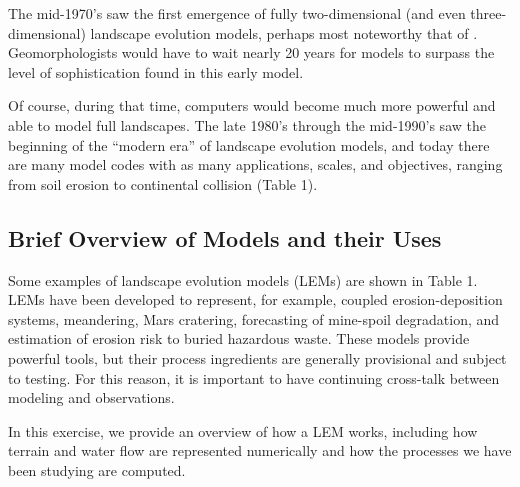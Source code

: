 \documentclass[12pt,reqno]{amsart}
\begin{document}
The mid-1970's saw the first emergence of fully two-dimensional (and
even three-dimensional) landscape evolution models, perhaps most
noteworthy that of \citet{ahnert1976}. Geomorphologists
would have to wait nearly 20 years for models to surpass the level of
sophistication found in
this early model. 

Of course, during that time, computers would become much more powerful
and able to model full landscapes. The late 1980's through the
mid-1990's saw the beginning of the ``modern era'' of landscape
evolution models, and today there are many model codes with as many
applications, scales, and objectives, ranging from soil erosion to
continental collision (Table 1).

\subsection{Brief Overview of Models and their Uses}

Some examples of landscape evolution models (LEMs) are shown in Table
1. LEMs have been developed to represent, for example, coupled
erosion-deposition systems, meandering, Mars cratering, forecasting of
mine-spoil degradation, and estimation of erosion risk to buried
hazardous waste. These models provide powerful tools, but their
process ingredients are generally provisional and subject to
testing. For this reason, it is important to have continuing
cross-talk between modeling and observations.

In this exercise, we provide an overview of how a LEM works, including
how terrain and water flow are represented numerically and how the
processes we have been studying are computed. 
\end{document}
